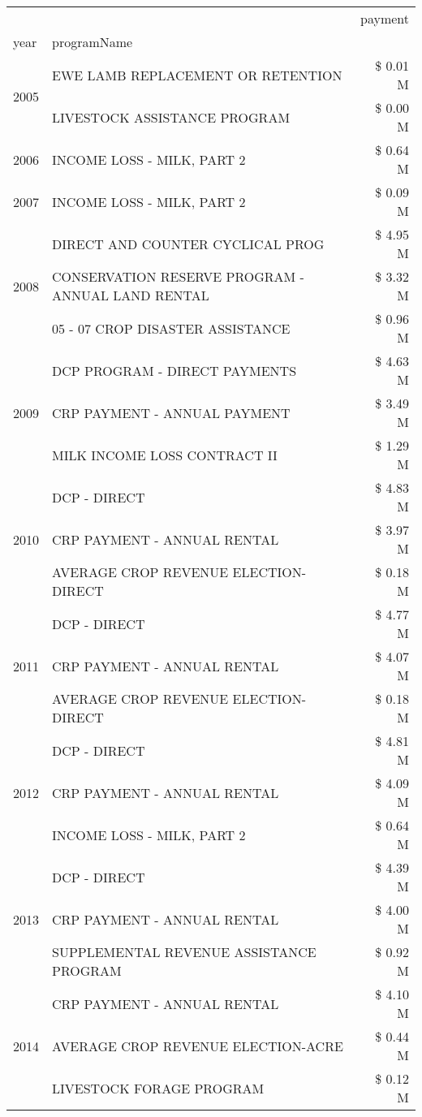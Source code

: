 \begin{tabular}{llr}
\toprule
 &  & payment \\
year & programName &  \\
\midrule
\multirow[t]{2}{*}{2005} & EWE LAMB REPLACEMENT OR RETENTION & \$ 0.01 M \\
 & LIVESTOCK ASSISTANCE PROGRAM & \$ 0.00 M \\
\cline{1-3}
2006 & INCOME LOSS - MILK, PART 2 & \$ 0.64 M \\
\cline{1-3}
2007 & INCOME LOSS - MILK, PART 2 & \$ 0.09 M \\
\cline{1-3}
\multirow[t]{3}{*}{2008} & DIRECT AND COUNTER CYCLICAL PROG & \$ 4.95 M \\
 & CONSERVATION RESERVE PROGRAM - ANNUAL LAND RENTAL & \$ 3.32 M \\
 & 05 - 07 CROP DISASTER ASSISTANCE & \$ 0.96 M \\
\cline{1-3}
\multirow[t]{3}{*}{2009} & DCP PROGRAM - DIRECT PAYMENTS & \$ 4.63 M \\
 & CRP PAYMENT - ANNUAL PAYMENT & \$ 3.49 M \\
 & MILK INCOME LOSS CONTRACT II & \$ 1.29 M \\
\cline{1-3}
\multirow[t]{3}{*}{2010} & DCP - DIRECT & \$ 4.83 M \\
 & CRP PAYMENT - ANNUAL RENTAL & \$ 3.97 M \\
 & AVERAGE CROP REVENUE ELECTION-DIRECT & \$ 0.18 M \\
\cline{1-3}
\multirow[t]{3}{*}{2011} & DCP - DIRECT & \$ 4.77 M \\
 & CRP PAYMENT - ANNUAL RENTAL & \$ 4.07 M \\
 & AVERAGE CROP REVENUE ELECTION-DIRECT & \$ 0.18 M \\
\cline{1-3}
\multirow[t]{3}{*}{2012} & DCP - DIRECT & \$ 4.81 M \\
 & CRP PAYMENT - ANNUAL RENTAL & \$ 4.09 M \\
 & INCOME LOSS - MILK, PART 2 & \$ 0.64 M \\
\cline{1-3}
\multirow[t]{3}{*}{2013} & DCP - DIRECT & \$ 4.39 M \\
 & CRP PAYMENT - ANNUAL RENTAL & \$ 4.00 M \\
 & SUPPLEMENTAL REVENUE ASSISTANCE PROGRAM & \$ 0.92 M \\
\cline{1-3}
\multirow[t]{3}{*}{2014} & CRP PAYMENT - ANNUAL RENTAL & \$ 4.10 M \\
 & AVERAGE CROP REVENUE ELECTION-ACRE & \$ 0.44 M \\
 & LIVESTOCK FORAGE PROGRAM & \$ 0.12 M \\

\end{tabular}
